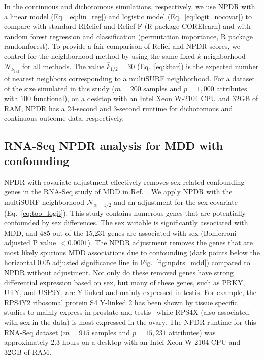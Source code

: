 \documentclass{bioinfo}
\begin{document}
In the continuous and dichotomous simulations, respectively, we use NPDR with a linear model (Eq.~\ref{eq:lin_reg}) and logistic model (Eq.~\ref{eq:logit_nocovar}) to compare with standard RRelief and Relief-F (R package CORElearn) and with random forest regression and classification (permutation importance, R package randomforest).
To provide a fair comparison of Relief and NPDR scores, we control for the neighborhood method by using the same fixed-$k$ neighborhood $\mathcal{N}_{\bar{k}_{1/2}}$ for all methods.
The value $\bar{k}_{1/2}=30$ (Eq.~\ref{eq:kbar}) is the expected number of nearest neighbors corresponding to a multiSURF neighborhood. %
For a dataset of the size simulated in this study ($m = 200$ samples and $p = 1,000$ attributes with $100$ functional), on a desktop with an Intel Xeon W-2104 CPU and 32GB of RAM, NPDR has a 24-second and 3-second runtime for dichotomous and continuous outcome data, respectively.

\subsection{RNA-Seq NPDR analysis for MDD with confounding}
NPDR with covariate adjustment effectively removes sex-related confounding genes in the RNA-Seq study of MDD in Ref.~\citep{mostafavi14}.
We apply NPDR with the multiSURF neighborhood $\mathcal{N}_{\alpha=1/2}$ and an adjustment for the sex covariate (Eq.~\ref{eq:too_logit}).
This study contains numerous genes that are potentially confounded by sex differences.
The sex variable is significantly associated with MDD, and 485 out of the 15,231 genes are associated with sex (Bonferroni-adjusted P value $<0.0001$).
The NPDR adjustment removes the genes that are most likely spurious MDD associations due to confounding (dark points below the horizontal 0.05 adjusted significance line in Fig.~\ref{fig:npdrs_mdd}) compared to NPDR without adjustment.
Not only do these removed genes have strong differential expression based on sex, but many of these genes, such as PRKY, UTY, and USP9Y, are Y-linked and mainly expressed in testis.
For example, the RPS4Y2 ribosomal protein S4 Y-linked 2 has been shown by tissue specific studies to mainly express in prostate and testis~\citep{lopes2010human} while RPS4X (also associated with sex in the data) is most expressed in the ovary.
The NPDR runtime for this RNA-Seq dataset ($m=915$ samples and $p=15,231$ attributes) was approximately 2.3 hours on a desktop with an Intel Xeon W-2104 CPU and 32GB of RAM.
\end{document}

